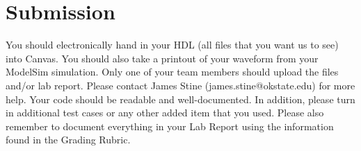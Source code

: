 \documentclass{article}
\begin{document}
\section{Submission}

You should electronically hand in your HDL (all files that you want
us to see) into Canvas.  You should also take a printout of your waveform 
from your ModelSim simulation.  Only one of your team members should upload
the files and/or lab report. Please contact James Stine
(james.stine@okstate.edu) 
for more help.  Your code should be
readable and well-documented. In addition, please turn in additional
test cases or any other added item that you used. 
Please also remember to document everything in your Lab Report using
the information found in the Grading Rubric.


    


\end{document}
